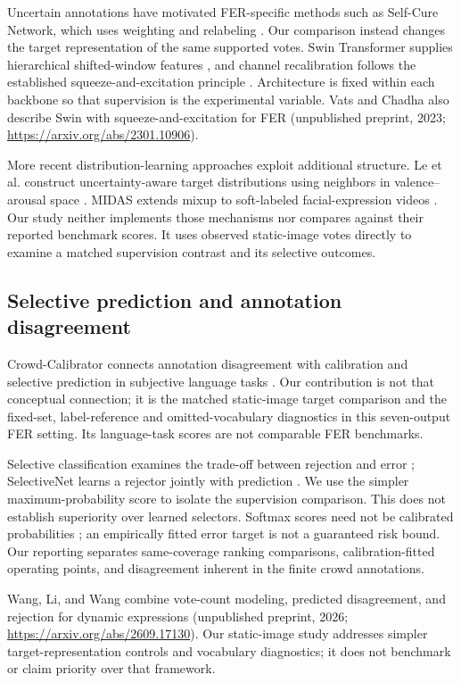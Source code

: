 \documentclass[pdflatex,sn-mathphys-num]{sn-jnl}
\begin{document}
Uncertain annotations have motivated FER-specific methods such as Self-Cure Network, which uses weighting and relabeling \cite{wang2020scn}. Our comparison instead changes the target representation of the same supported votes. Swin Transformer supplies hierarchical shifted-window features \cite{liu2021swin}, and channel recalibration follows the established squeeze-and-excitation principle \cite{hu2018senet}. Architecture is fixed within each backbone so that supervision is the experimental variable.
Vats and Chadha also describe Swin with squeeze-and-excitation for FER (unpublished preprint, 2023; \url{https://arxiv.org/abs/2301.10906}).

More recent distribution-learning approaches exploit additional structure. Le et al. construct uncertainty-aware target distributions using neighbors in valence--arousal space \cite{le2023uncertainty}. MIDAS extends mixup to soft-labeled facial-expression videos \cite{kawamura2024midas}. Our study neither implements those mechanisms nor compares against their reported benchmark scores. It uses observed static-image votes directly to examine a matched supervision contrast and its selective outcomes.

\subsection{Selective prediction and annotation disagreement}
Crowd-Calibrator connects annotation disagreement with calibration and selective prediction in subjective language tasks \cite{khurana2024crowd}. Our contribution is not that conceptual connection; it is the matched static-image target comparison and the fixed-set, label-reference and omitted-vocabulary diagnostics in this seven-output FER setting. Its language-task scores are not comparable FER benchmarks.

Selective classification examines the trade-off between rejection and error \cite{geifman2017selective}; SelectiveNet learns a rejector jointly with prediction \cite{geifman2019selectivenet}. We use the simpler maximum-probability score to isolate the supervision comparison. This does not establish superiority over learned selectors. Softmax scores need not be calibrated probabilities \cite{guo2017calibration}; an empirically fitted error target is not a guaranteed risk bound. Our reporting separates same-coverage ranking comparisons, calibration-fitted operating points, and disagreement inherent in the finite crowd annotations.

Wang, Li, and Wang combine vote-count modeling, predicted disagreement, and rejection for dynamic expressions (unpublished preprint, 2026; \url{https://arxiv.org/abs/2609.17130}). Our static-image study addresses simpler target-representation controls and vocabulary diagnostics; it does not benchmark or claim priority over that framework.
\end{document}
